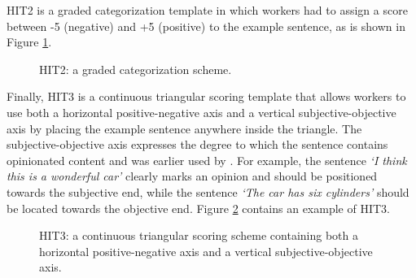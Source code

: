 \documentclass[11pt, a4paper,onecolumn]{article}
\begin{document}
HIT2 is a graded categorization template in which workers had to assign a score between -5 (negative) and +5 (positive) to the example sentence, as is shown in Figure \ref{hit2}. 

\begin{figure}[ht]
  \begin{center}
	\caption{HIT2: a graded categorization scheme.}
	\label{hit2}
  \end{center}
\end{figure}



Finally, HIT3 is a continuous triangular scoring template that allows workers to use both a horizontal positive-negative axis and a vertical subjective-objective axis by placing the example sentence anywhere inside the triangle. The subjective-objective axis expresses the degree to which the sentence contains opinionated content and was earlier used by \cite{sentiwordnet:06}. For example, the sentence \textit{`I think this is a wonderful car'} clearly marks an opinion and should be positioned towards the subjective end, while the sentence \textit{`The car has six cylinders'} should be located towards the objective end. Figure \ref{hit3} contains an example of HIT3. 

\begin{figure}[ht]
  \begin{center}
	\caption{HIT3: a continuous triangular scoring scheme containing both a horizontal positive-negative axis and a vertical subjective-objective axis.}
	\label{hit3}
  \end{center}
\end{figure}
\end{document}
